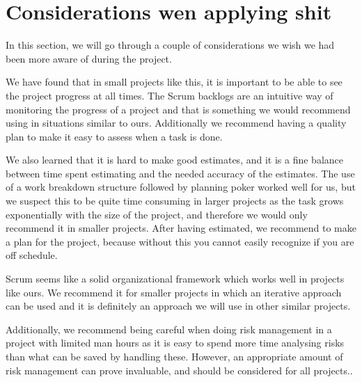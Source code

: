\section{Considerations wen applying shit}
In this section, we will go through a couple of considerations we wish we had
been more aware of during the project.

We have found that in small projects like this, it is important to be able to
see the project progress at all times. The Scrum backlogs are an intuitive way
of monitoring the progress of a project and that is something we would
recommend using in situations similar to ours. Additionally we recommend having
a quality plan to make it easy to assess when a task is done.

We also learned that it is hard to make good estimates, and it is a fine
balance between time spent estimating and the needed accuracy of the estimates.
The use of a work breakdown structure followed by planning poker worked well
for us, but we suspect this to be quite time consuming in larger projects as
the task grows exponentially with the size of the project, and therefore we
would only recommend it in smaller projects. After having estimated, we
recommend to make a plan for the project, because without this you cannot
easily recognize if you are off schedule.

Scrum seems like a solid organizational framework which works well in projects
like ours. We recommend it for smaller projects in which an iterative approach
can be used and it is definitely an approach we will use in other similar
projects.

Additionally, we recommend being careful when doing risk management in a
project with limited man hours as it is easy to spend more time analysing risks
than what can be saved by handling these. However, an appropriate amount of
risk management can prove invaluable, and should be considered for all
projects..
